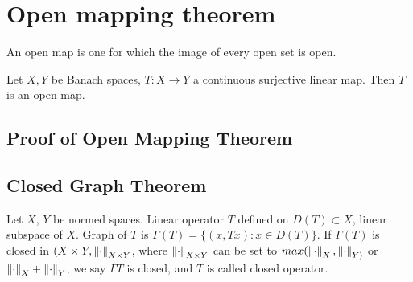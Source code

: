 \newpage
\section{Open mapping theorem}
\begin{definition}\label{open map}\nl
	An open map is one for which the image of every open set is open.
\end{definition}
\begin{theorem}\label{OMT}\nl
	Let $X,Y$ be Banach spaces, $T:X\xrightarrow{}Y$ a continuous surjective linear map. Then $T$ is an open map.
\end{theorem}

\begin{proposition}\label{Equinorm}
	\placeholder
\end{proposition}
\subsection{Proof of Open Mapping Theorem}
\placeholder
\subsection{Closed Graph Theorem}

\begin{definition}\nl
	Let $X$, $Y$ be normed spaces. Linear operator $T$ defined on $D(T)\subset X$, linear subspace of $X$. Graph of $T$ is $\Gamma (T)=\{(x,Tx):x\in D(T)\}$. If $\Gamma (T)$ is closed in $(X\times Y,\left\|{\cdot}\right\|_{X\times Y}$, where $\left\|{\cdot}\right\|_{X\times Y}$ can be set to $max(\left\|{\cdot}\right\|_{X},\left\|{\cdot}\right\|_{Y)}$ or $\left\|{\cdot}\right\|_{X}+\left\|{\cdot}\right\|_{Y}$, we say $\Gamma T$ is closed, and $T$ is called closed operator.
\end{definition}


